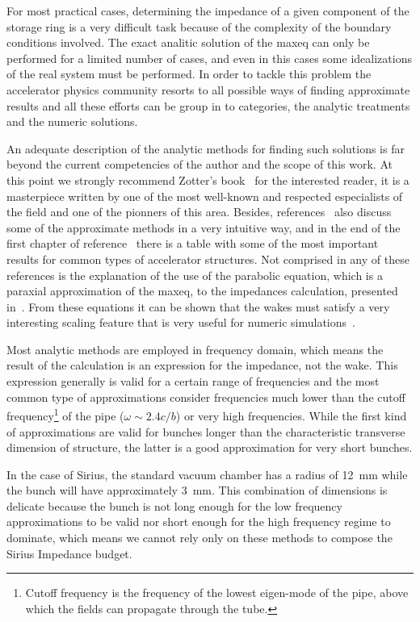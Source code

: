     For most practical cases, determining the impedance of a given component of the storage ring is a very difficult task because of the complexity of the boundary conditions involved. The exact analitic solution of the \gls{maxeq} can only be performed for a limited number of cases, and even in this cases some idealizations of the real system must be performed. In order to tackle this problem the accelerator physics community resorts to all possible ways of finding approximate results and all these efforts can be group in to categories, the analytic treatments and the numeric solutions.

	An adequate description of the analytic methods for finding such solutions is far beyond the current competencies of the author and the scope of this work. At this point we strongly recommend Zotter's book~\cite{Zotter1997} for the interested reader, it is a masterpiece written by one of the most well-known and respected especialists of the field and one of the pionners of this area. Besides, references~\cite{CHao1993, Palumbo1994} also discuss some of the approximate methods in a very intuitive way, and in the end of the first chapter of reference~\cite{Ng2009} there is a table with some of the most important results for common types of accelerator structures. Not comprised in any of these references is the explanation of the use of the parabolic equation, which is a paraxial approximation of the \gls{maxeq}, to the impedances calculation, presented in~\cite{Stupakov2007}. From these equations it can be shown that the wakes must satisfy a very interesting scaling feature that is very useful for numeric simulations~\cite{stupakov2009}.

    Most analytic methods are employed in frequency domain, which means the result of the calculation is an expression for the impedance, not the wake. This expression generally is valid for a certain range of frequencies and the most common type of approximations consider frequencies much lower than the cutoff frequency\footnote{Cutoff frequency is the frequency of the lowest eigen-mode of the pipe, above which the fields can propagate through the tube.} of the pipe ($\omega\sim2.4c/b$) or very high frequencies. While the first kind of approximations are valid for bunches longer than the characteristic transverse dimension of structure, the latter is a good approximation for very short bunches.

    In the case of Sirius, the standard vacuum chamber has a radius of \SI{12}{\milli\meter} while the bunch will have approximately \SI{3}{\milli\meter}. This combination of dimensions is delicate because the bunch is not long enough for the low frequency approximations to be valid nor short enough for the high frequency regime to dominate, which means we cannot rely only on these methods to compose the Sirius Impedance budget.


